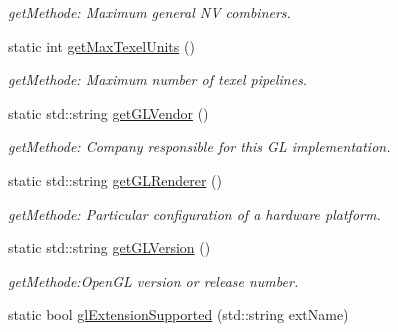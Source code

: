 \begin{DoxyCompactItemize}
\begin{DoxyCompactList}\small\item\em getMethode: Maximum general NV combiners. \item\end{DoxyCompactList}\item 
\hypertarget{class_f2_c_1_1_shader_g_l_a969a13fd7e87ce416cf243cf49a44034}{
static int \hyperlink{class_f2_c_1_1_shader_g_l_a969a13fd7e87ce416cf243cf49a44034}{getMaxTexelUnits} ()}
\label{class_f2_c_1_1_shader_g_l_a969a13fd7e87ce416cf243cf49a44034}

\begin{DoxyCompactList}\small\item\em getMethode: Maximum number of texel pipelines. \item\end{DoxyCompactList}\item 
\hypertarget{class_f2_c_1_1_shader_g_l_a643f74a22c4f910c9a1d6a84c7b67ee0}{
static std::string \hyperlink{class_f2_c_1_1_shader_g_l_a643f74a22c4f910c9a1d6a84c7b67ee0}{getGLVendor} ()}
\label{class_f2_c_1_1_shader_g_l_a643f74a22c4f910c9a1d6a84c7b67ee0}

\begin{DoxyCompactList}\small\item\em getMethode: Company responsible for this GL implementation. \item\end{DoxyCompactList}\item 
\hypertarget{class_f2_c_1_1_shader_g_l_a7a41ad95bf3c0ae86152ecf1fea9b7b6}{
static std::string \hyperlink{class_f2_c_1_1_shader_g_l_a7a41ad95bf3c0ae86152ecf1fea9b7b6}{getGLRenderer} ()}
\label{class_f2_c_1_1_shader_g_l_a7a41ad95bf3c0ae86152ecf1fea9b7b6}

\begin{DoxyCompactList}\small\item\em getMethode: Particular configuration of a hardware platform. \item\end{DoxyCompactList}\item 
\hypertarget{class_f2_c_1_1_shader_g_l_abbde9db82c97e347fdb71a6f0439478c}{
static std::string \hyperlink{class_f2_c_1_1_shader_g_l_abbde9db82c97e347fdb71a6f0439478c}{getGLVersion} ()}
\label{class_f2_c_1_1_shader_g_l_abbde9db82c97e347fdb71a6f0439478c}

\begin{DoxyCompactList}\small\item\em getMethode:OpenGL version or release number. \item\end{DoxyCompactList}\item 
\hypertarget{class_f2_c_1_1_shader_g_l_a1fd0395e7ad7b6a270fc0dbd6285ecdd}{
static bool \hyperlink{class_f2_c_1_1_shader_g_l_a1fd0395e7ad7b6a270fc0dbd6285ecdd}{glExtensionSupported} (std::string extName)}
\label{class_f2_c_1_1_shader_g_l_a1fd0395e7ad7b6a270fc0dbd6285ecdd}


\end{DoxyCompactItemize}
